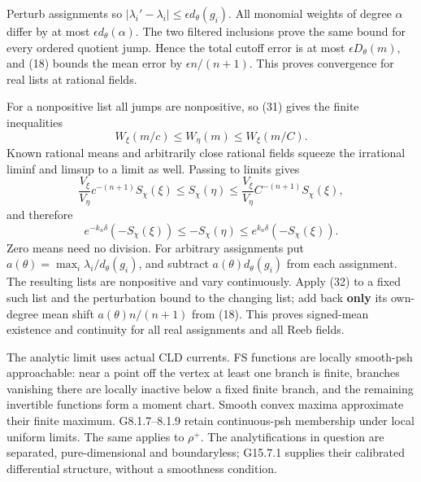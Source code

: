 \documentclass[
  10pt,
]{article}
\begin{document}
Perturb assignments so
\(|\lambda_i'-\lambda_i|\leq\epsilon d_\theta(g_i)\). All monomial
weights of degree \(\alpha\) differ by at most
\(\epsilon d_\theta(\alpha)\). The two filtered inclusions prove the
same bound for every ordered quotient jump. Hence the total cutoff error
is at most \(\epsilon D_\theta(m)\), and (18) bounds the mean error by
\(\epsilon n/(n+1)\). This proves convergence for real lists at rational
fields.

For a nonpositive list all jumps are nonpositive, so (31) gives the
finite inequalities \[ W_\xi(m/c)\leq W_\eta(m)\leq W_\xi(m/C). \] Known
rational means and arbitrarily close rational fields squeeze the
irrational liminf and limsup to a limit as well. Passing to limits gives
\[ \frac{V_\xi}{V_\eta}c^{-(n+1)}S_\chi(\xi)\leq S_\chi(\eta)
 \leq\frac{V_\xi}{V_\eta}C^{-(n+1)}S_\chi(\xi), \] and therefore
\[ e^{-k_n\delta}(-S_\chi(\xi))\leq-S_\chi(\eta)\leq e^{k_n\delta}(-S_\chi(\xi)).                 \tag{32}\]
Zero means need no division. For arbitrary assignments put
\(a(\theta)=\max_i\lambda_i/d_\theta(g_i)\), and subtract
\(a(\theta)d_\theta(g_i)\) from each assignment. The resulting lists are
nonpositive and vary continuously. Apply (32) to a fixed such list and
the perturbation bound to the changing list; add back \textbf{only} its
own-degree mean shift \(a(\theta)n/(n+1)\) from (18). This proves
signed-mean existence and continuity for all real assignments and all
Reeb fields.

The analytic limit uses actual CLD currents. FS functions are locally
smooth-psh approachable: near a point off the vertex at least one branch
is finite, branches vanishing there are locally inactive below a fixed
finite branch, and the remaining invertible functions form a moment
chart. Smooth convex maxima approximate their finite maximum.
G8.1.7--8.1.9 retain continuous-psh membership under local uniform
limits. The same applies to \(\rho^+\). The analytifications in question
are separated, pure-dimensional and boundaryless; G15.7.1 supplies their
calibrated differential structure, without a smoothness condition.
\end{document}
